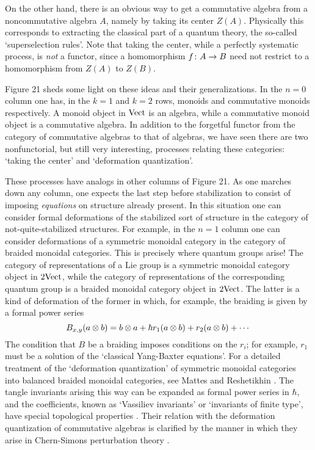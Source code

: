 On the other hand, there is an obvious way to get a commutative
algebra from a noncommutative algebra $A$, namely by taking its
center $Z(A)$.   Physically this corresponds to extracting the
classical part of a quantum theory, the so-called `superselection
rules'.  Note that taking the center, while a perfectly
systematic process, is {\it not} a functor, since a homomorphism
$f \colon A \to B$ need not restrict to a homomorphism from $Z(A)$
to $Z(B)$.

Figure 21 sheds some light on these ideas and their
generalizations.  In the $n = 0$ column one has, in the  $k = 1$
and $k = 2$ rows, monoids and commutative monoids respectively.
A monoid object in ${\rm Vect}$ is an algebra, while  a commutative
monoid object is a commutative algebra.  In addition to the
forgetful functor from the category of commutative algebras to
that of algebras, we have seen there are two nonfunctorial, but
still very interesting, processes relating these categories:
`taking the center' and `deformation quantization'.

These processes have analogs in other columns of Figure 21.   As
one marches down any column, one expects the last step before
stabilization to consist of imposing {\it equations} on structure
already present.  In this situation one can consider formal
deformations of the stabilized sort of structure in the category
of not-quite-stabilized structures.  For example, in the $n = 1$
column one can consider deformations of a symmetric monoidal
category in the category of braided monoidal categories.  This is
precisely where quantum groups arise!  The category of
representations of a Lie group is a symmetric monoidal category
object in $2{\rm Vect}$, while the category of representations of the
corresponding quantum group is a braided monoidal category object
in $2{\rm Vect}$.  The latter is a kind of deformation of the former
in which, for example, the braiding is given by a formal power
series
\[   B_{x,y}(a \otimes b) = b \otimes a + \hbar r_1(a
\otimes b) +  r_2(a \otimes b) + \cdots \]
The condition that $B$ be
a braiding imposes conditions on the $r_i$; for example, $r_1$
must be a solution of the `classical Yang-Baxter equations'.
For a detailed treatment of the `deformation
quantization' of symmetric monoidal categories into balanced
braided monoidal categories, see Mattes and Reshetikhin
\cite{MR}.   The tangle invariants arising this way can be
expanded as formal power series in $\hbar$, and the coefficients,
known as `Vassiliev invariants' or `invariants of finite type',
have special topological properties \cite{Barnatan,Birman}.
Their relation with the deformation quantization of commutative
algebras is clarified by the manner in which they arise in
Chern-Simons perturbation theory \cite{AMR}.

